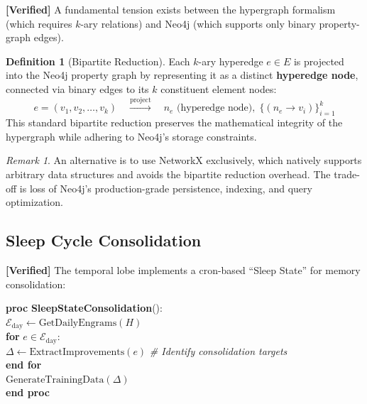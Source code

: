 \documentclass[11pt]{article}
\newcommand{\verified}{\textcolor{verifiedgreen}{\textbf{[Verified]}}}
\theoremstyle{definition}
\newtheorem{definition}{Definition}[section]
\theoremstyle{remark}
\newtheorem{remark}{Remark}[section]
\begin{document}
\verified{} A fundamental tension exists between the hypergraph formalism
(which requires $k$-ary relations) and Neo4j (which supports only binary
property-graph edges).

\begin{definition}[Bipartite Reduction]
\label{def:bipartite}
Each $k$-ary hyperedge $e \in E$ is projected into the Neo4j property graph
by representing it as a distinct \textbf{hyperedge node}, connected via binary
edges to its $k$ constituent element nodes:
\[
  e = (v_1, v_2, \ldots, v_k)
  \quad \xrightarrow{\text{project}} \quad
  n_e \text{ (hyperedge node)}, \;
  \{(n_e \to v_i)\}_{i=1}^{k}
\]
This standard bipartite reduction preserves the mathematical integrity of the
hypergraph while adhering to Neo4j's storage constraints.
\end{definition}

\begin{remark}
An alternative is to use NetworkX exclusively, which natively supports
arbitrary data structures and avoids the bipartite reduction overhead. The
trade-off is loss of Neo4j's production-grade persistence, indexing, and
query optimization.
\end{remark}

\subsection{Sleep Cycle Consolidation}

\verified{} The temporal lobe implements a cron-based ``Sleep State'' for
memory consolidation:

\begin{pseudocodebox}
\label{alg:sleep}
\begin{tabbing}
\textbf{proc} \= \textbf{SleepStateConsolidation}(): \\
\> $\mathcal{E}_{\text{day}} \gets \text{GetDailyEngrams}(H)$ \\
\> \textbf{for} $e \in \mathcal{E}_{\text{day}}$: \\
\> $\Delta \gets \text{ExtractImprovements}(e)$ \hfill\textit{\# Identify consolidation targets} \\
\> \textbf{end for} \\
\> $\text{GenerateTrainingData}(\Delta)$ \\
\textbf{end proc}
\end{tabbing}
\end{pseudocodebox}
\end{document}
